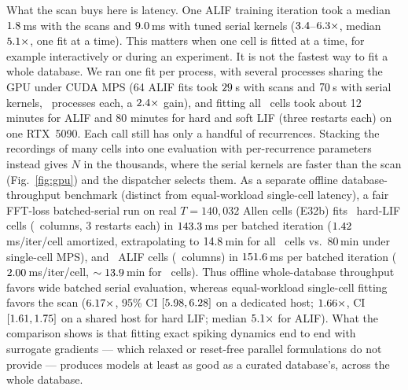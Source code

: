 \documentclass[10pt]{article}
\theoremstyle{remark}
\begin{document}
What the scan buys here is latency. One ALIF training iteration took a median $1.8$\,ms with the scans and $9.0$\,ms with tuned serial kernels ($3.4$--$6.3\times$, median $5.1\times$, one fit at a time). This matters when one cell is fitted at a time, for example interactively or during an experiment. It is not the fastest way to fit a whole database. We ran one fit per process, with several processes sharing the GPU under CUDA MPS (64 ALIF fits took $29$\,s with scans and $70$\,s with serial kernels, \TpScanW\ processes each, a $2.4\times$ gain), and fitting all \GlifCellsAll\ cells took about 12 minutes for ALIF and 80 minutes for hard and soft LIF (three restarts each) on one RTX~5090. Each call still has only a handful of recurrences. Stacking the recordings of many cells into one evaluation with per-recurrence parameters instead gives $N$ in the thousands, where the serial kernels are faster than the scan (Fig.~\ref{fig:gpu}) and the dispatcher selects them. As a separate offline database-throughput benchmark (distinct from equal-workload single-cell latency), a fair FFT-loss batched-serial run on real $T=140{,}032$ Allen cells (E32b) fits \BatchedHardCells\ hard-LIF cells (\BatchedHardCols\ columns, 3 restarts each) in $143.3$\,ms per batched iteration ($1.42$\,ms/iter/cell amortized, extrapolating to $14.8$\,min for all \GlifCellsAll\ cells vs.\ 80\,min under single-cell MPS), and \BatchedAlifCells\ ALIF cells (\BatchedAlifCols\ columns) in $151.6$\,ms per batched iteration ($2.00$\,ms/iter/cell, $\sim13.9$\,min for \GlifCellsAll\ cells). Thus offline whole-database throughput favors wide batched serial evaluation, whereas equal-workload single-cell fitting favors the scan ($6.17\times$, 95\% CI $[5.98,6.28]$ on a dedicated host; $1.66\times$, CI $[1.61,1.75]$ on a shared host for hard LIF; median $5.1\times$ for ALIF). What the comparison shows is that fitting exact spiking dynamics end to end with surrogate gradients --- which relaxed or reset-free parallel formulations do not provide --- produces models at least as good as a curated database's, across the whole database.
\end{document}
